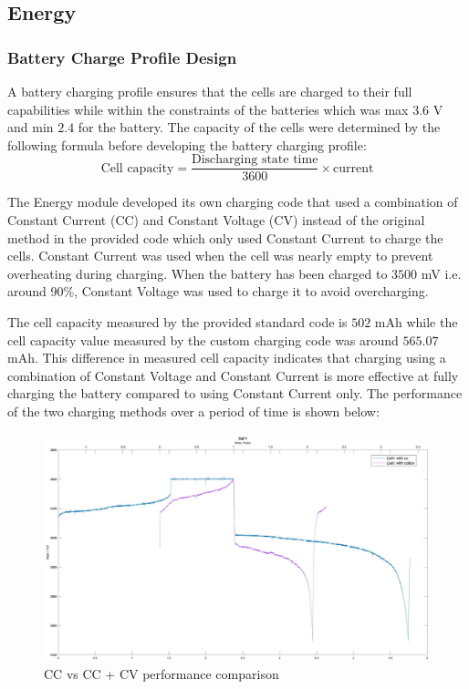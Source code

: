 \documentclass[11pt, a4paper]{article}
\begin{document}
\pagebreak
\subsection{Energy}
\subsubsection{Battery Charge Profile Design}

A battery charging profile ensures that the cells are charged to their full capabilities while within the constraints of the batteries which was max $3.6$ V and min $2.4$ for the battery. The capacity of the cells were determined by the following formula before developing the battery charging profile:
$$
\text{Cell capacity} = \frac{\text{Discharging state time}}{3600} \times \text{current}
$$

The Energy module developed its own charging code that used a combination of Constant Current (CC) and Constant Voltage (CV) instead of the original method in the provided code which only used Constant Current to charge the cells. Constant Current was used when the cell was nearly empty to prevent overheating during charging\cite{Energy_constant_current}. When the battery has been charged to $3500$ mV i.e. around 90\%, Constant Voltage was used to charge it to avoid overcharging. 

The cell capacity measured by the provided standard code is $502$ mAh while the cell capacity value measured by the custom charging code was around $565.07$ mAh. This difference in measured cell capacity indicates that charging using a combination of Constant Voltage and Constant Current is more effective at fully charging the battery compared to using Constant Current only. The performance of the two charging methods over a period of time is shown below:
\begin{figure} [h!]
    \centering
    \includegraphics[scale=0.5]{CC and CV.JPG}
    \caption{CC vs CC + CV performance comparison}
\end{figure} 
\end{document}
